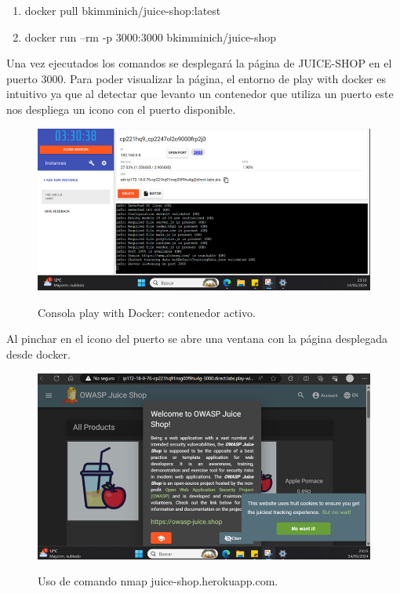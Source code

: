 \documentclass[stu, 11pt, letterpaper, donotrepeattitle, floatsintext, natbib]{apa7}
\begin{document}
\begin{enumerate}
  \item docker pull bkimminich/juice-shop:latest
  \item  docker run --rm -p 3000:3000 bkimminich/juice-shop
\end{enumerate}

Una vez ejecutados los comandos se desplegará la página de JUICE-SHOP en el puerto 3000. Para poder visualizar la página, el entorno de play with docker es intuitivo ya que al detectar que levanto un contenedor que utiliza un puerto este nos despliega un icono con el puerto disponible.

\begin{figure}[H]
    \centering
    \caption{Consola play with Docker: contenedor activo.}
    \includegraphics[width=0.75\linewidth]{docker5.png} %
    \label{fig:OverallEffect}
\end{figure}

Al pinchar en el icono del puerto se abre una ventana con la página desplegada desde docker.

\begin{figure}[H]
    \centering
    \caption{Uso de comando nmap juice-shop.herokuapp.com.}
    \includegraphics[width=0.75\linewidth]{docker6.png} %
    \label{fig:OverallEffect}
\end{figure}
\end{document}
